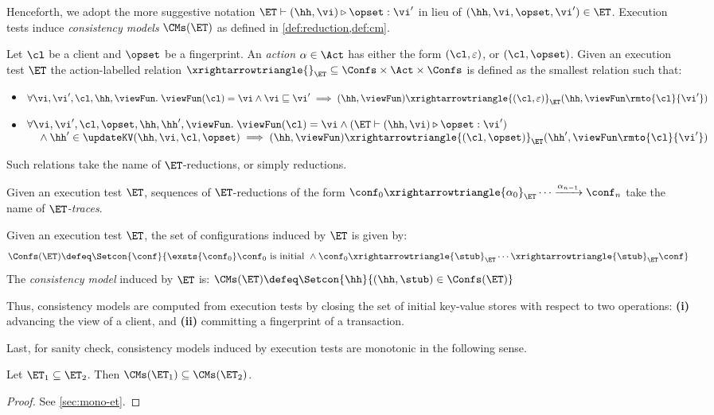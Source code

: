 Henceforth, we adopt the more suggestive notation $\ET \vdash (\hh, \vi) \triangleright \opset: \vi'$ 
in lieu of $(\hh, \vi, \opset, \vi') \in \ET$.
Execution tests induce \emph{consistency models} \( \CMs(\ET) \) as defined in \cref{def:reduction,def:cm}.
\begin{definition}[$\ET$-reductions]
\label{def:reduction}
Let $\cl$ be a client and $\opset$ be a fingerprint. 
An \emph{action} $\alpha \in \Act$ has either the form $(\cl, \varepsilon)$, 
or $(\cl, \opset)$. 
Given an execution test $\ET$ the action-labelled relation 
$\xrightarrowtriangle{}_{\ET} \subseteq \Confs \times \Act \times \Confs$ 
is defined as the smallest relation such that:
\begin{itemize}
\item 
    $\forall \vi, \vi', \cl, \hh, \viewFun.\; 
    \viewFun(\cl) = \vi 
    \wedge \vi \sqsubseteq \vi' 
    \implies (\hh, \viewFun) \xrightarrowtriangle{(\cl, \varepsilon)}_{\ET} 
    (\hh, \viewFun\rmto{\cl}{\vi'})$
\item 
    $\begin{array}[t]{@{}l@{}}
        \forall \vi, \vi', \cl, \opset, \hh, \hh', \viewFun.\; 
        \viewFun(\cl) = \vi
        \wedge (\ET \vdash (\hh, \vi) \triangleright \opset: \vi')  \\
        \quad {} \wedge \hh' \in \updateKV(\hh, \vi, \cl, \opset) 
        \implies (\hh, \viewFun) \xrightarrowtriangle{(\cl, \opset)}_{\ET} (\hh', \viewFun\rmto{\cl}{\vi'})
    \end{array}$
\end{itemize}
Such relations take the name of $\ET$-reductions, or simply reductions.
\end{definition}
Given an execution test $\ET$, sequences of $\ET$-reductions of the form $\conf_{0} \xrightarrowtriangle{\alpha_{0}}_{\ET} \cdots 
\xrightarrow{\alpha_{n-1}} \conf_{n}$ take the name of \emph{$\ET$-traces}.
\begin{definition}
\label{def:cm}
Given an execution test $\ET$, the set of configurations induced by $\ET$ is given by:
\[
\Confs(\ET) \defeq \Setcon{ \conf}{ \exsts{\conf_0} \conf_0 \text{ is initial } \wedge \conf_0 \xrightarrowtriangle{\stub}_{\ET} \cdots \xrightarrowtriangle{\stub}_{\ET} \conf }
\]
The \emph{consistency model} induced by $\ET$ is:
\( 
\CMs(\ET) \defeq \Setcon{ \hh }{ (\hh, \stub) \in \Confs(\ET) }
\)
\end{definition}
Thus, consistency models are computed from execution tests by closing the set of initial key-value stores with respect to two operations: 
\textbf{(i)} advancing the view of a client, 
and \textbf{(ii)} committing a fingerprint of a transaction. 

Last, for sanity check, consistency models induced by execution tests are monotonic in the following sense.
\begin{proposition}
\label{prop:mono-et}
Let $\ET_1 \subseteq \ET_2$. Then $\CMs(\ET_1) \subseteq \CMs(\ET_2)$.
\end{proposition}
\begin{proof}
    \ifTechReport
    
    \else
    See \cref{sec:mono-et}.
    \fi
\end{proof}
